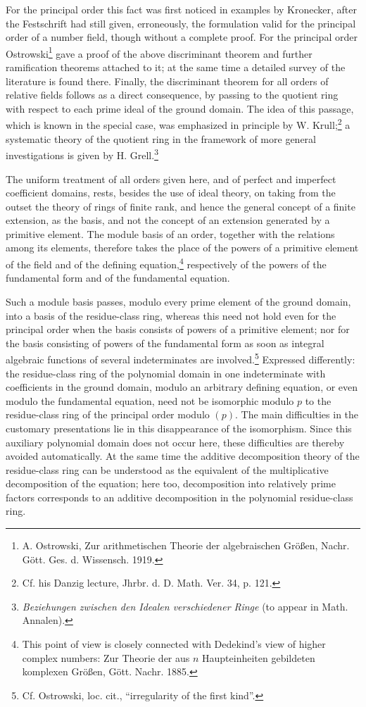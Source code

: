 \documentclass[11pt]{article}
\begin{document}
For the principal order this fact was first noticed in examples by Kronecker, after the Festschrift had still given, erroneously, the formulation valid for the principal order of a number field, though without a complete proof. For the principal order Ostrowski\footnote{A. Ostrowski, Zur arithmetischen Theorie der algebraischen Größen, Nachr. Gött. Ges. d. Wissensch. 1919.} gave a proof of the above discriminant theorem and further ramification theorems attached to it; at the same time a detailed survey of the literature is found there. Finally, the discriminant theorem for all orders of relative fields follows as a direct consequence, by passing to the quotient ring with respect to each prime ideal of the ground domain. The idea of this passage, which is known in the special case, was emphasized in principle by W. Krull;\footnote{Cf. his Danzig lecture, Jhrbr. d. D. Math. Ver. 34, p. 121.} a systematic theory of the quotient ring in the framework of more general investigations is given by H. Grell.\footnote{\emph{Beziehungen zwischen den Idealen verschiedener Ringe} (to appear in Math. Annalen).}

The uniform treatment of all orders given here, and of perfect and imperfect coefficient domains, rests, besides the use of ideal theory, on taking from the outset the theory of rings of finite rank, and hence the general concept of a finite extension, as the basis, and not the concept of an extension generated by a primitive element. The module basis of an order, together with the relations among its elements, therefore takes the place of the powers of a primitive element of the field and of the defining equation,\footnote{This point of view is closely connected with Dedekind's view of higher complex numbers: Zur Theorie der aus $n$ Haupteinheiten gebildeten komplexen Größen, Gött. Nachr. 1885.} respectively of the powers of the fundamental form and of the fundamental equation.

Such a module basis passes, modulo every prime element of the ground domain, into a basis of the residue-class ring, whereas this need not hold even for the principal order when the basis consists of powers of a primitive element; nor for the basis consisting of powers of the fundamental form as soon as integral algebraic functions of several indeterminates are involved.\footnote{Cf. Ostrowski, loc. cit., ``irregularity of the first kind''.} Expressed differently: the residue-class ring of the polynomial domain in one indeterminate with coefficients in the ground domain, modulo an arbitrary defining equation, or even modulo the fundamental equation, need not be isomorphic modulo $p$ to the residue-class ring of the principal order modulo $(p)$. The main difficulties in the customary presentations lie in this disappearance of the isomorphism. Since this auxiliary polynomial domain does not occur here, these difficulties are thereby avoided automatically. At the same time the additive decomposition theory of the residue-class ring can be understood as the equivalent of the multiplicative decomposition of the equation; here too, decomposition into relatively prime factors corresponds to an additive decomposition in the polynomial residue-class ring.
\end{document}
